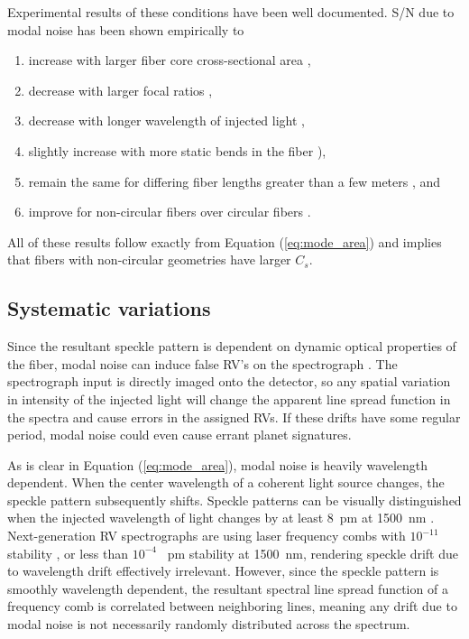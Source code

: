 Experimental results of these conditions have been well documented. S/N due to modal noise has been shown empirically to
\begin{enumerate}
\item increase with larger fiber core cross-sectional area \citep{lemke_characterising_2010, sablowski_comparing_2016},
\item decrease with larger focal ratios \citep{baudrand_modal_2001, sablowski_comparing_2016},
\item decrease with longer wavelength of injected light \citep{baudrand_modal_2001},
\item slightly increase with more static bends in the fiber \citep[changing the NA;][]{imai_evaluation_1979}),
\item remain the same for differing fiber lengths greater than a few meters \citep{baudrand_modal_2001}, and
\item improve for non-circular fibers over circular fibers \citep{sablowski_comparing_2016, sturmer_optimal_2016}.
\end{enumerate}
All of these results follow exactly from Equation (\ref{eq:mode_area}) and implies that fibers with non-circular geometries have larger $C_{s}$.

\subsection{Systematic variations}
\label{modal-noise:mn:sys-var}

Since the resultant speckle pattern is dependent on dynamic optical properties of the fiber, modal noise can induce false RV's on the spectrograph \citep{mahadevan_suppression_2014}. The spectrograph input is directly imaged onto the detector, so any spatial variation in intensity of the injected light will change the apparent line spread function in the spectra and cause errors in the assigned RVs. If these drifts have some regular period, modal noise could even cause errant planet signatures.

As is clear in Equation (\ref{eq:mode_area}), modal noise is heavily wavelength dependent. When the center wavelength of a coherent light source changes, the speckle pattern subsequently shifts.  Speckle patterns can be visually distinguished when the injected wavelength of light changes by at least \SI{8}{\pico\meter} at \SI{1500}{\nano\meter} \citep{redding_all-fiber_2013}. Next-generation RV spectrographs are using laser frequency combs with $10^{-11}$ stability \citep{probst_laser_2014}, or less than $10^{-4}$ \SI{}{\pico\meter} stability at \SI{1500}{\nano\meter}, rendering speckle drift due to wavelength drift effectively irrelevant. However, since the speckle pattern is smoothly wavelength dependent, the resultant spectral line spread function of a frequency comb is correlated between neighboring lines, meaning any drift due to modal noise is not necessarily randomly distributed across the spectrum.

